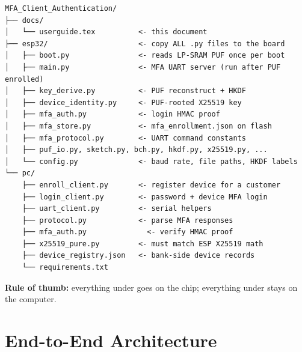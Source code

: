 \documentclass[11pt,a4paper]{article}
\newcommand{\filepath}[1]{\texttt{\detokenize{#1}}}
\begin{document}
\begin{verbatim}
MFA_Client_Authentication/
├── docs/
│   └── userguide.tex          <- this document
├── esp32/                     <- copy ALL .py files to the board
│   ├── boot.py                <- reads LP-SRAM PUF once per boot
│   ├── main.py                <- MFA UART server (run after PUF enrolled)
│   ├── key_derive.py          <- PUF reconstruct + HKDF
│   ├── device_identity.py     <- PUF-rooted X25519 key
│   ├── mfa_auth.py            <- login HMAC proof
│   ├── mfa_store.py           <- mfa_enrollment.json on flash
│   ├── mfa_protocol.py        <- UART command constants
│   ├── puf_io.py, sketch.py, bch.py, hkdf.py, x25519.py, ...
│   └── config.py              <- baud rate, file paths, HKDF labels
└── pc/
    ├── enroll_client.py       <- register device for a customer
    ├── login_client.py        <- password + device MFA login
    ├── uart_client.py         <- serial helpers
    ├── protocol.py            <- parse MFA responses
    ├── mfa_auth.py              <- verify HMAC proof
    ├── x25519_pure.py         <- must match ESP X25519 math
    ├── device_registry.json   <- bank-side device records
    └── requirements.txt
\end{verbatim}

\textbf{Rule of thumb:} everything under \filepath{esp32/*.py} goes on the chip;
everything under \filepath{pc/} stays on the computer.

\section{End-to-End Architecture}

\begin{center}
\end{center}
\end{document}
